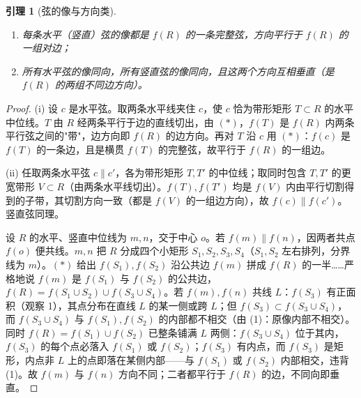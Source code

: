 \documentclass[12pt,a4paper]{ctexart}
\theoremstyle{ding}
\newtheorem{lemma}{引理}[section]
\theoremstyle{definition}
\begin{document}
\begin{lemma}[弦的像与方向类]\label{lem:chord}
\begin{enumerate}[label=(\roman*)]
  \item 每条水平（竖直）弦的像都是 $f(R)$ 的一条完整弦，方向平行于 $f(R)$ 的一组对边；
  \item 所有水平弦的像同向，所有竖直弦的像同向，且这两个方向互相垂直（是 $f(R)$ 的两组不同边方向）。
\end{enumerate}
\end{lemma}
\begin{proof}
(i) 设 $c$ 是水平弦。取两条水平线夹住 $c$，使 $c$ 恰为带形矩形 $T\subset R$ 的水平中位线。$T$ 由 $R$ 经两条平行于边的直线切出，由 $(*)$，$f(T)$ 是 $f(R)$ 内两条平行弦之间的"带"，边方向即 $f(R)$ 的边方向。再对 $T$ 沿 $c$ 用 $(*)$：$f(c)$ 是 $f(T)$ 的一条边，且是横贯 $f(T)$ 的完整弦，故平行于 $f(R)$ 的一组边。

(ii) 任取两条水平弦 $c\parallel c'$，各为带形矩形 $T,T'$ 的中位线；取同时包含 $T,T'$ 的更宽带形 $V\subset R$（由两条水平线切出）。$f(T),f(T')$ 均是 $f(V)$ 内由平行切割得到的子带，其切割方向一致（都是 $f(V)$ 的一组边方向），故 $f(c)\parallel f(c')$。竖直弦同理。

设 $R$ 的水平、竖直中位线为 $m,n$，交于中心 $o$。若 $f(m)\parallel f(n)$，因两者共点 $f(o)$ 便共线。$m,n$ 把 $R$ 分成四个小矩形 $S_1,S_2,S_3,S_4$（$S_1,S_2$ 左右排列，分界线为 $m$）。$(*)$ 给出 $f(S_1),f(S_2)$ 沿公共边 $f(m)$ 拼成 $f(R)$ 的一半……严格地说 $f(m)$ 是 $f(S_1)$ 与 $f(S_2)$ 的公共边，$f(R)=f(S_1\cup S_2)\cup f(S_3\cup S_4)$。若 $f(m),f(n)$ 共线 $L$：$f(S_3)$ 有正面积（观察 1），其点分布在直线 $L$ 的某一侧或跨 $L$；但 $f(S_3)\subset f(S_3\cup S_4)$，而 $f(S_3\cup S_4)$ 与 $f(S_1),f(S_2)$ 的内部都不相交（由 (1)：原像内部不相交）。同时 $f(R)=f(S_1)\cup f(S_2)$ 已整条铺满 $L$ 两侧：$f(S_3\cup S_4)$ 位于其内，$f(S_3)$ 的每个点必落入 $f(S_1)$ 或 $f(S_2)$；$f(S_3)$ 有内点，而 $f(S_3)$ 是矩形，内点非 $L$ 上的点即落在某侧内部——与 $f(S_1)$ 或 $f(S_2)$ 内部相交，违背 (1)。故 $f(m)$ 与 $f(n)$ 方向不同；二者都平行于 $f(R)$ 的边，不同向即垂直。
\end{proof}
\end{document}

